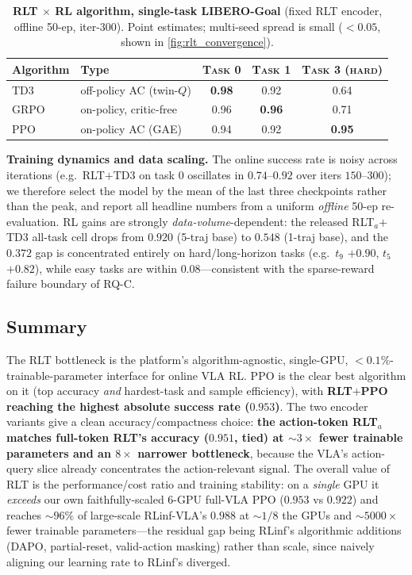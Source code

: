\documentclass[11pt]{article}
\begin{document}
\begin{table}[t]
    \centering
    \caption{\textbf{RLT $\times$ RL algorithm, single-task LIBERO-Goal} (fixed RLT encoder, offline 50-ep, iter-300). Point estimates; multi-seed spread is small ($<0.05$, shown in \cref{fig:rlt_convergence}).}
    \label{tab:rlt_algo}
    \vspace{0.3em}
    \footnotesize
    \setlength{\tabcolsep}{8pt}
    \renewcommand{\arraystretch}{1.15}
    \begin{tabular}{@{}l l ccc@{}}
        \toprule
        \textbf{Algorithm} & \textbf{Type} & \textsc{Task 0} & \textsc{Task 1} & \textsc{Task 3 (hard)} \\
        \midrule
        TD3  & off-policy AC (twin-$Q$)      & \textbf{0.98} & 0.92 & 0.64 \\
        GRPO & on-policy, critic-free        & 0.96 & \textbf{0.96} & 0.71 \\
        PPO  & on-policy AC (GAE)            & 0.94 & 0.92 & \textbf{0.95} \\
        \bottomrule
    \end{tabular}
\end{table}

\textbf{Training dynamics and data scaling.} The online success rate is noisy across iterations (e.g.\ RLT$+$TD3 on task $0$ oscillates in $0.74$--$0.92$ over iters $150$--$300$); we therefore select the model by the mean of the last three checkpoints rather than the peak, and report all headline numbers from a uniform \emph{offline} 50-ep re-evaluation. RL gains are strongly \emph{data-volume}-dependent: the released RLT$_a$$+$TD3 all-task cell drops from $0.920$ (5-traj base) to $0.548$ (1-traj base), and the $0.372$ gap is concentrated entirely on hard/long-horizon tasks (e.g.\ $t_9$ $+0.90$, $t_5$ $+0.82$), while easy tasks are within $0.08$---consistent with the sparse-reward failure boundary of RQ-C.

\subsection{Summary}
The RLT bottleneck is the platform's algorithm-agnostic, single-GPU, $<0.1\%$-trainable-parameter interface for online VLA RL. PPO is the clear best algorithm on it (top accuracy \emph{and} hardest-task and sample efficiency), with \textbf{RLT$+$PPO reaching the highest absolute success rate ($0.953$)}. The two encoder variants give a clean accuracy/compactness choice: \textbf{the action-token RLT$_a$ matches full-token RLT's accuracy ($0.951$, tied) at ${\sim}3\times$ fewer trainable parameters and an $8\times$ narrower bottleneck}, because the VLA's action-query slice already concentrates the action-relevant signal. The overall value of RLT is the performance/cost ratio and training stability: on a \emph{single} GPU it \emph{exceeds} our own faithfully-scaled $6$-GPU full-VLA PPO ($0.953$ vs $0.922$) and reaches ${\sim}96\%$ of large-scale RLinf-VLA's $0.988$ at ${\sim}1/8$ the GPUs and ${\sim}5000\times$ fewer trainable parameters---the residual gap being RLinf's algorithmic additions (DAPO, partial-reset, valid-action masking) rather than scale, since naively aligning our learning rate to RLinf's diverged.
\end{document}
